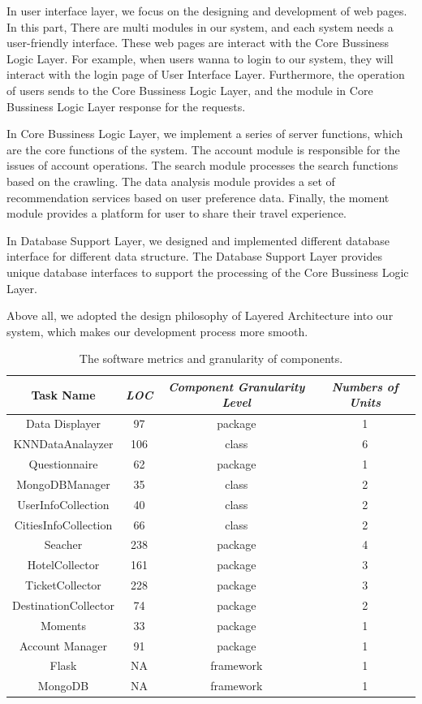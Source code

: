 \documentclass[conference]{IEEEtran}
\begin{document}
In user interface layer, we focus on the designing and development of web pages. In this part,  There are multi modules in our system, and each system needs a user-friendly interface. These web pages are interact with the Core Bussiness Logic Layer. For example, when users wanna to login to our system, they will interact with the login page of User Interface Layer. Furthermore, the operation of users sends to the Core Bussiness Logic Layer, and the module in Core Bussiness Logic Layer response for the requests.

In Core Bussiness Logic Layer, we implement a series of server functions, which are the core functions of the system. The account module is responsible for the issues of account operations. The search module processes the search functions based on the crawling. The data analysis module provides a set of recommendation services based on user preference data. Finally, the moment module provides a platform for user to share their travel experience.

In Database Support Layer, we designed and implemented different database interface for different data structure. The Database Support Layer provides unique database interfaces to support the processing of the Core Bussiness Logic Layer.

Above all, we adopted the design philosophy of Layered Architecture into our system, which makes our development process more smooth.



\begin{table}[htbp]
\caption{The software metrics and granularity of components.}
\begin{center}
\begin{tabular}{|c|c|c|c|}
\hline
\textbf{Task Name} & \textbf{\textit{LOC}}& \textbf{\textit{Component Granularity Level}}& \textbf{\textit{Numbers of Units}} \\
\hline
Data Displayer & 97  & package & 1 \\
KNNDataAnalayzer & 106 & class &  6 \\
Questionnaire & 62 & package & 1 \\
MongoDBManager & 35 & class & 2 \\
UserInfoCollection & 40 & class & 2 \\
CitiesInfoCollection & 66 & class & 2 \\
Seacher & 238 & package & 4\\
HotelCollector & 161 & package & 3\\
TicketCollector & 228 & package & 3\\
DestinationCollector & 74 & package & 2\\
Moments & 33 & package & 1\\
Account Manager& 91 &package&1\\

Flask & NA & framework & 1 \\
MongoDB & NA & framework & 1 \\

\hline
\end{tabular}
\label{tab1}
\end{center}
\end{table}
\end{document}
